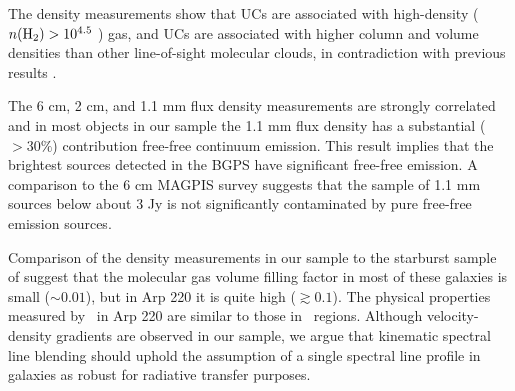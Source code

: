 The density measurements show that UCs are associated with
high-density ($n(\textrm{H}_{2})>10^{4.5}$ \percc) gas, and UCs are associated with
higher column and volume densities than other line-of-sight molecular clouds,
in contradiction with previous results \citep{Wadiak1988}.  

The 6 cm, 2 cm, and 1.1 mm flux density measurements are strongly correlated
and in most objects in our sample the 1.1 mm flux density has a substantial ($>30\%$) contribution 
free-free continuum emission.  This result implies that the
brightest sources detected in the BGPS have significant free-free emission.
A comparison to the 6 cm MAGPIS survey suggests that the sample of 1.1 mm
sources below about 3 Jy is not significantly contaminated by pure free-free
emission sources.  



Comparison of the density measurements in our sample to the starburst sample of
\citet{Mangum2008} suggest that the molecular gas volume filling factor in most of
these galaxies is small ($\sim 0.01$), but in Arp 220 it is quite high
($\gtrsim 0.1$).  The physical properties measured by \formaldehyde\ in Arp 220
are similar to those in \uchii\ regions.  Although velocity-density gradients
are observed in our sample, we argue that kinematic spectral line blending
should uphold the assumption of a single spectral line profile in galaxies as
robust for radiative transfer purposes.



